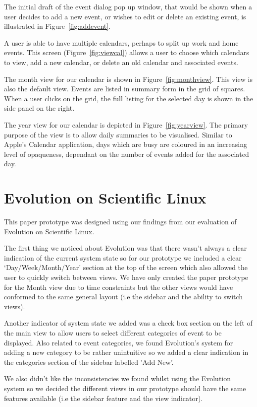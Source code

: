 \documentclass{article}
\begin{document}
The initial draft of the event dialog pop up window, that would be
shown when a user decides to add a new event, or wishes to edit or
delete an existing event, is illustrated in Figure~\ref{fig:addevent}.

A user is able to have multiple calendars, perhaps to split up work and
home events. This screen (Figure~\ref{fig:viewcal}) allows a user to
choose which calendars to view, add a new calendar, or delete an old
calendar and associated events.

The month view for our calendar is shown in Figure~\ref{fig:monthview}.
This view is also the default view. Events are listed in summary form
in the grid of squares. When a user clicks on the grid, the full listing
for the selected day is shown in the side panel on the right.

The year view for our calendar is depicted in Figure~\ref{fig:yearview}.
The primary purpose of the view is to allow daily summaries to be
visualised. Similar to Apple's Calendar application, days which are
busy are coloured in an increasing level of opaqueness, dependant on
the number of events added for the associated day.

\section{Evolution on Scientific Linux}

This paper prototype was designed using our findings from our evaluation 
of Evolution on Scientific Linux.

The first thing we noticed about Evolution was that there wasn't always
a clear indication of the current system state so for our prototype we
included a clear `Day/Week/Month/Year' section at the top of the screen
which also allowed the user to quickly switch between views. We have only
created the paper prototype for the Month view due to time constraints
but the other views would have conformed to the same general layout (i.e
the sidebar and the ability to switch views).

Another indicator of system state we added was a check box section on
the left of the main view to allow users to select different categories
of event to be displayed. Also related to event categories, we found
Evolution's system for adding a new category to be rather unintuitive
so we added a clear indication in the categories section of the sidebar
labelled 'Add New'.

We also didn't like the inconsistencies we found whilst using the
Evolution system so we decided the different views in our prototype
should have the same features available (i.e the sidebar feature and
the view indicator).
\end{document}
